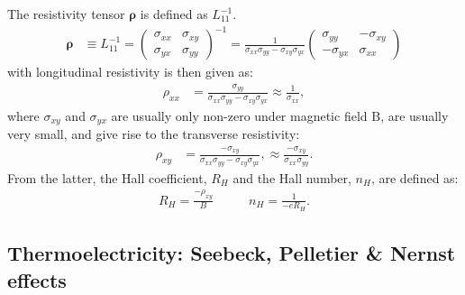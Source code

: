 \documentclass[notitlepage,11pt,nofootinbib]{revtex4-1}
\renewcommand{\vec}[1]{\bm{\mathrm{#1}}}
\begin{document}
The resistivity tensor $\boldsymbol{\rho}$ is defined as $L_{11}^{-1}$.
\begin{align}
\boldsymbol{\rho} &\equiv L_{11}^{-1}
=
\begin{pmatrix}
\sigma_{xx} & \sigma_{xy}\\
\sigma_{yx} & \sigma_{yy}
\end{pmatrix}^{-1}
=
\frac{1}{\sigma_{xx}\sigma_{yy}-\sigma_{xy}\sigma_{yx}}
\begin{pmatrix}
\sigma_{yy} & -\sigma_{xy}\\
-\sigma_{yx} & \sigma_{xx}
\end{pmatrix}
\end{align}
with longitudinal resistivity is then given as:
\begin{align}
\rho_{xx} 
&= 
\frac{\sigma_{yy}}{\sigma_{xx}\sigma_{yy} - \sigma_{xy}\sigma_{yx}}
\approx
\boxed{
\frac{1}{\sigma_{xx}}
},
\label{eq_resistivity}
\end{align}
where $\sigma_{xy}$ and $\sigma_{yx}$ are usually only non-zero under magnetic field $\vec B$, are usually very small, and give rise to the transverse resistivity:
\begin{align}
\rho_{xy} 
&= 
\frac{-\sigma_{xy}}{\sigma_{xx}\sigma_{yy} - \sigma_{xy}\sigma_{yx}},
\approx
\boxed{
\frac{-\sigma_{xy}}{\sigma_{xx}\sigma_{yy}}
}.
\end{align}
From the latter, the Hall coefficient, $R_H$ and the Hall number, $n_H$, are defined as:
\begin{align}
R_H = \frac{-\rho_{xy}}{B}
&\qquad
n_H = \frac{1}{-eR_H}.
\end{align}



\subsection{Thermoelectricity: Seebeck, Pelletier \& Nernst effects}
\end{document}

